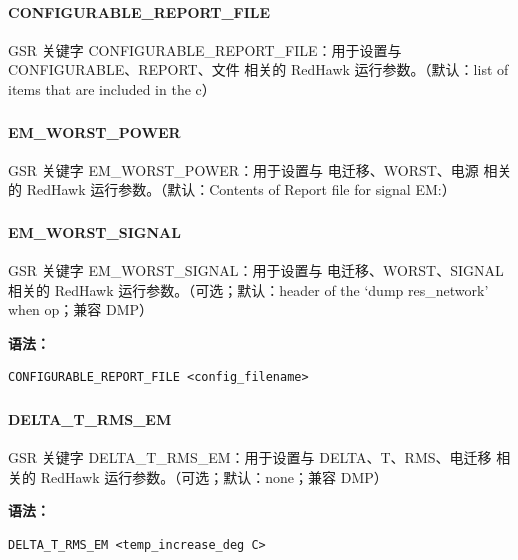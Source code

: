 \paragraph*{CONFIGURABLE_REPORT_FILE}

GSR 关键字 CONFIGURABLE_REPORT_FILE：用于设置与 CONFIGURABLE、REPORT、文件 相关的 RedHawk 运行参数。（默认：list of items that are included in the c）

\subsubsection{}
\paragraph*{EM_WORST_POWER}

GSR 关键字 EM_WORST_POWER：用于设置与 电迁移、WORST、电源 相关的 RedHawk 运行参数。（默认：Contents of Report file for signal EM:）

\subsubsection{}
\paragraph*{EM_WORST_SIGNAL}

GSR 关键字 EM_WORST_SIGNAL：用于设置与 电迁移、WORST、SIGNAL 相关的 RedHawk 运行参数。（可选；默认：header of the ‘dump res_network’ when op；兼容 DMP）

\textbf{语法：}
\begin{lstlisting}
CONFIGURABLE_REPORT_FILE <config_filename>
\end{lstlisting}

\subsubsection{}
\paragraph*{DELTA_T_RMS_EM}

GSR 关键字 DELTA_T_RMS_EM：用于设置与 DELTA、T、RMS、电迁移 相关的 RedHawk 运行参数。（可选；默认：none；兼容 DMP）

\textbf{语法：}
\begin{lstlisting}
DELTA_T_RMS_EM <temp_increase_deg C>
\end{lstlisting}


